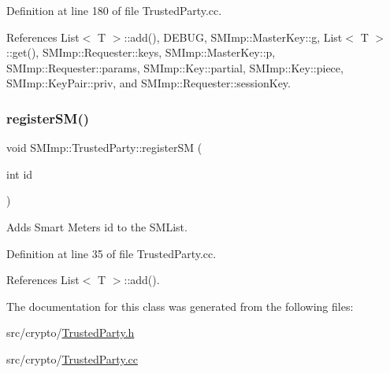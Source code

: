 Definition at line 180 of file Trusted\+Party.\+cc.



References List$<$ T $>$\+::add(), D\+E\+B\+UG, S\+M\+Imp\+::\+Master\+Key\+::g, List$<$ T $>$\+::get(), S\+M\+Imp\+::\+Requester\+::keys, S\+M\+Imp\+::\+Master\+Key\+::p, S\+M\+Imp\+::\+Requester\+::params, S\+M\+Imp\+::\+Key\+::partial, S\+M\+Imp\+::\+Key\+::piece, S\+M\+Imp\+::\+Key\+Pair\+::priv, and S\+M\+Imp\+::\+Requester\+::session\+Key.

\mbox{\label{classSMImp_1_1TrustedParty_adc01721f3200888877174376a5b2464f}} 
\subsubsection{\texorpdfstring{register\+S\+M()}{registerSM()}}
{\footnotesize\ttfamily void S\+M\+Imp\+::\+Trusted\+Party\+::register\+SM (\begin{DoxyParamCaption}\item[{int}]{id }\end{DoxyParamCaption})}

Adds Smart Meter\textquotesingle{}s id to the S\+M\+List. 

Definition at line 35 of file Trusted\+Party.\+cc.



References List$<$ T $>$\+::add().



The documentation for this class was generated from the following files\+:\begin{DoxyCompactItemize}
\item 
src/crypto/\hyperlink{TrustedParty_8h}{Trusted\+Party.\+h}\item 
src/crypto/\hyperlink{TrustedParty_8cc}{Trusted\+Party.\+cc}\end{DoxyCompactItemize}
